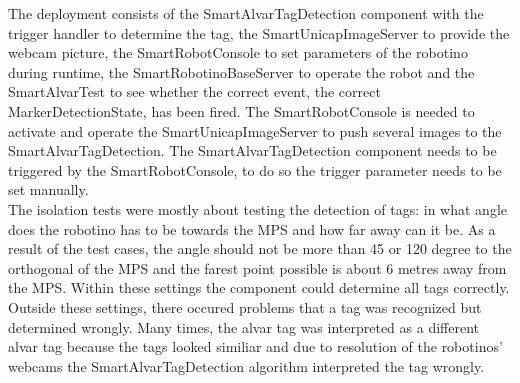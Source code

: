 The deployment consists of the SmartAlvarTagDetection component with the trigger handler to determine the tag, the SmartUnicapImageServer to provide the webcam picture, the SmartRobotConsole to set parameters of the robotino during runtime, the SmartRobotinoBaseServer to operate the robot and the SmartAlvarTest to see whether the correct event, the correct MarkerDetectionState, has been fired. The SmartRobotConsole is needed to activate and operate the SmartUnicapImageServer to push several images to the SmartAlvarTagDetection. The SmartAlvarTagDetection component needs to be triggered by the SmartRobotConsole, to do so the trigger parameter needs to be set manually. \\

The isolation tests were mostly about testing the detection of tags: in what angle does the robotino has to be towards the MPS and how far away can it be. As a result of the test cases, the angle should not be more than 45 or 120 degree to the orthogonal of the MPS and the farest point possible is about 6 metres away from the MPS. Within these settings the component could determine all tags correctly. Outside these settings, there occured problems that a tag was recognized but determined wrongly. Many times, the alvar tag was interpreted as a different alvar tag because the tags looked similiar and due to resolution of the robotinos' webcams the SmartAlvarTagDetection algorithm interpreted the tag wrongly.





